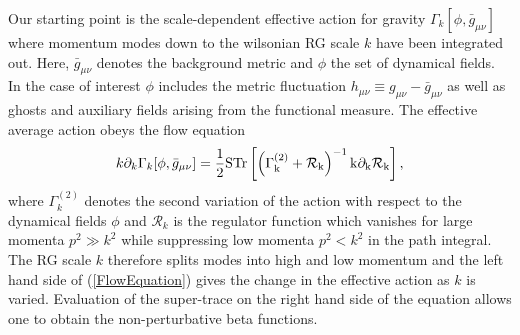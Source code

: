 \documentclass[notitlepage,eqsecnum,bm,amsmath,preprintnumbers,superscriptaddress,nofootinbib,aps,11pt]{revtex4-1}
\def\eq#1{(\ref{#1})}
\begin{document}
Our starting point is the scale-dependent effective action for gravity $\Gamma_k[\phi, \bar{g}_{\mu\nu}]$ where momentum modes down to the wilsonian RG scale $k$ have been integrated out. Here, $\bar{g}_{\mu\nu}$ denotes the background metric and $\phi$ the set of dynamical fields. In the case of interest $\phi$ includes the metric fluctuation $h_{\mu\nu} \equiv g_{\mu\nu} - \bar{g}_{\mu\nu}$ as well as ghosts and auxiliary fields arising from the functional measure. The effective average action obeys the flow equation \cite{Wetterich:1992yh,Morris:1993qb}
\begin{equation}
k\partial_k\Gamma_k[\phi,\bar{g}_{\mu\nu}]=\frac{1}{2}\rm{STr}\left[\left(\Gamma^{(2)}_k+\mathcal{R}_k\right)^{-1} k\partial_k\mathcal{R}_k\right],\label{FlowEquation}
\end{equation}
where $\Gamma^{(2)}_k$ denotes the second variation of the action with respect to the dynamical fields $\phi$ and $\mathcal{R}_k$ is the regulator function which vanishes for large momenta $p^2 \gg k^2$ while suppressing low momenta $p^2< k^2$ in the path integral. The RG scale $k$ therefore splits modes into high and low momentum and the left hand side of \eq{FlowEquation} gives the change in the effective action as $k$ is varied. Evaluation of the  super-trace on the right hand side of the equation allows one to obtain the non-perturbative beta functions. 
\end{document}
